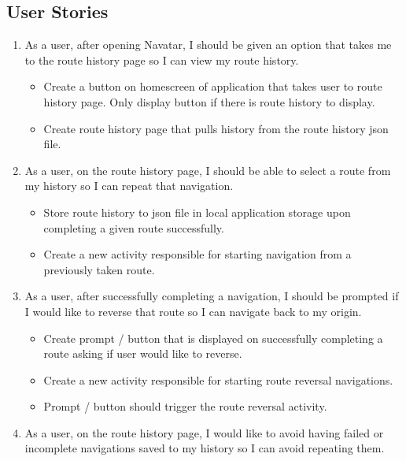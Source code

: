 \documentclass{scrreprt}
\begin{document}
\subsection{User Stories}
\begin{enumerate}
	\item As a user, after opening Navatar, I should be given an option that takes me to the route history page so I can view my route history.
	
		\begin{itemize}
			\item Create a button on homescreen of application that takes user to route history page. Only display button if there is route history to display.
			\item Create route history page that pulls history from the route history json file.
		\end{itemize}
	
	\item As a user, on the route history page, I should be able to select a route from my history so I can repeat that navigation.
	
		\begin{itemize}
			\item Store route history to json file in local application storage upon completing a given route successfully.
			\item Create a new activity responsible for starting navigation from a previously taken route.
		\end{itemize}
	
	\item As a user, after successfully completing a navigation, I should be prompted if I would like to reverse that route so I can navigate back to my origin.
	
		\begin{itemize}
			\item Create prompt / button that is displayed on successfully completing a route asking if user would like to reverse.
			\item Create a new activity responsible for starting route reversal navigations.
			\item Prompt / button should trigger the route reversal activity.
		\end{itemize}
\pagebreak
	\item As a user, on the route history page, I would like to avoid having failed or incomplete navigations saved to my history so I can avoid repeating them.
	

\end{enumerate}
\end{document}
